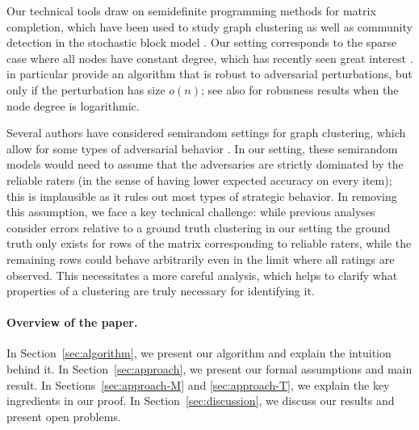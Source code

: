 Our technical tools draw on semidefinite programming methods for matrix 
completion, which have been used to study graph clustering as well 
as community detection in the stochastic block model \citep{holland1983stochastic,condon2001algorithms}. 
Our setting corresponds to the sparse case where all nodes have constant degree, 
which has recently seen great interest \citep{decelle2011asymptotic,
mossel2012stochastic,mossel2013proof,mossel2013belief,
massoulie2014community,guedon2014community,mossel2015consistency,
chin2015stochastic,abbe2015community,makarychev2015learning}. 
\citet{makarychev2015learning} in particular provide an algorithm that is 
robust to adversarial perturbations, but only if the perturbation has 
size $o(n)$; see also \citet{cai2015robust} for robusness results when 
the node degree is logarithmic.

Several authors have considered semirandom settings for graph clustering, which 
allow for some types of adversarial behavior \citep{feige2000finding,
feige2001heuristics,coja2004coloring,krivelevich2006semirandom,
coja2007solving,makarychev2012approximation,chen2014improved,guedon2014community,
moitra2015robust,agarwal2015multisection}. 
In our setting, these semirandom models would need to assume that the adversaries 
are strictly dominated by the reliable raters (in the sense of having lower 
expected accuracy on every item); this is implausible as it rules out 
most types of strategic behavior.
In removing this assumption, we face a key technical challenge: while previous 
analyses consider errors relative to a ground truth clustering 
in our setting 
the ground truth only exists for rows of the matrix corresponding to reliable 
raters, while the remaining rows could behave arbitrarily even in the limit 
where all ratings are observed. This necessitates a more careful analysis, 
which helps to clarify what properties of a clustering are truly necessary 
for identifying it.


\paragraph{Overview of the paper.} In Section~\ref{sec:algorithm}, we 
present our algorithm and explain the intuition behind it.
In Section~\ref{sec:approach}, we present our formal assumptions and main 
result. 
In Sections~\ref{sec:approach-M} and \ref{sec:approach-T}, we explain 
the key ingredients in our proof.
In Section~\ref{sec:discussion}, we discuss our results and 
present open problems.
